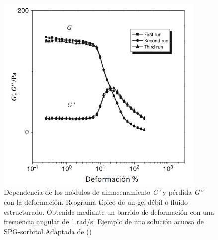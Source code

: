 \begin{figure}\centering
    \includegraphics[width=0.9\textwidth]{Graphics/weak_gel}
    \caption[Reograma de un gel débil.]{Dependencia de los módulos de almacenamiento \emph{G'} y pérdida \emph{G''} con la deformación. Reograma típico de un gel débil o fluido estructurado. Obtenido mediante un barrido de deformación con una frecuencia angular de 1 rad/s. Ejemplo de una solución acuosa de SPG-sorbitol.Adaptada de (\cite{Nishinari2009})}
    \label{fig:estructurado}
\end{figure}

